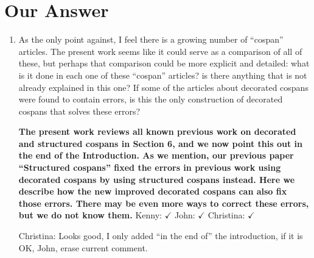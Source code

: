 \documentclass[reqno]{amsart}
\def\chris{\color{purple} Christina: }
\def\john{\color{red} John: }
\def\kenny{\color{blue} Kenny: }
\begin{document}
\section{Our Answer}


\begin{enumerate}

\item As the only point against, I feel there is a growing number of “cospan” articles. The present work seems like it could serve as a 
comparison of 
all of 
these, but perhaps that comparison could be more explicit and detailed: what is it done in each one of these “cospan” articles? is there anything 
that 
is not already explained in this one? If some of the articles about decorated cospans were found to contain errors, is this the only construction of 
decorated cospans that solves these errors?

{\bf The present work reviews all known previous work on decorated and structured cospans in Section 6, and we now point this out in the end of 
the Introduction.   As we mention, our previous paper ``Structured 
cospans'' fixed the errors in previous work using decorated cospans by using structured cospans instead.   Here we describe how the new improved 
decorated cospans can also fix those errors.     There may be even more ways to correct these errors, but we do not know them.}  {\kenny $\checkmark$} 
{\john $\checkmark$} {\chris $\checkmark$}





{\chris Looks good, I only added ``in the end of'' the introduction, if it is OK, John, erase current comment.}


\end{enumerate}
\end{document}
